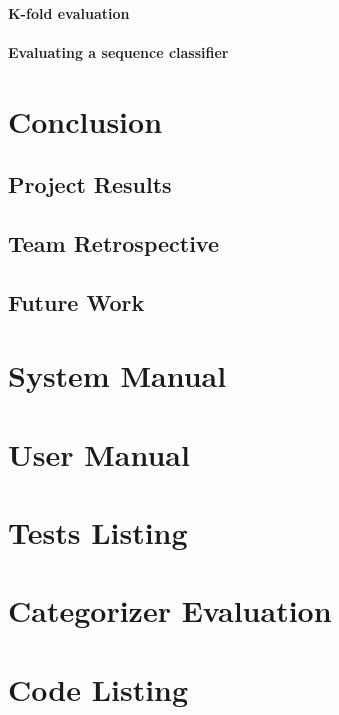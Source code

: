 \documentclass[12pt, twoside, a4paper, draft]{report}
\begin{document}
\subsubsection{K-fold evaluation}
\subsubsection{Evaluating a sequence classifier}

\chapter{Conclusion}
\section{Project Results}
\section{Team Retrospective}
\section{Future Work}

\appendix
\chapter{System Manual}
\chapter{User Manual}
\chapter{Tests Listing}
\chapter{Categorizer Evaluation}
\chapter{Code Listing}
\end{document}
